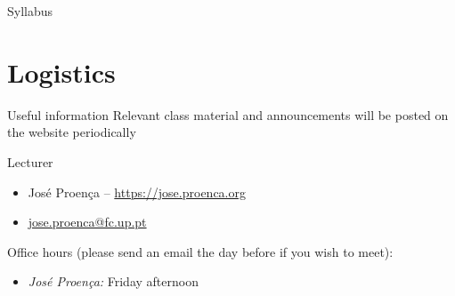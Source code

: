 \documentclass[aspectratio=169]{beamer}
\begin{document}
\begin{slide}{Syllabus}
\end{slide}


\section{Logistics}

\begin{frame}{Useful information}
  Relevant class material and announcements will be posted on the website periodically

  {\centering{}

  }

  \alert{Lecturer}
    \begin{itemize}
      \item José Proença -- \url{https://jose.proenca.org}
      \item \href{mailto:jose.proenca@fc.up.pt}{jose.proenca@fc.up.pt}
    \end{itemize}
           

  \alert{Office hours} (please send an email the day before if you wish to meet):
  \begin{itemize}
    \item \emph{José Proença:} Friday afternoon
  \end{itemize} 
\end{frame}
\end{document}
